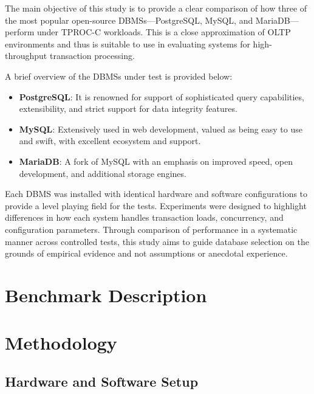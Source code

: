 The main objective of this study is to provide a clear comparison of how three of the most popular open-source DBMSs—PostgreSQL, MySQL, and MariaDB—perform under TPROC-C workloads. This is a close approximation of OLTP environments and thus is suitable to use in evaluating systems for high-throughput transaction processing.

A brief overview of the DBMSs under test is provided below:

\begin{itemize}
    \item \textbf{PostgreSQL}: It is renowned for support of sophisticated query capabilities, extensibility, and strict support for data integrity features.
    \item \textbf{MySQL}: Extensively used in web development, valued as being easy to use and swift, with excellent ecosystem and support.
    \item \textbf{MariaDB}: A fork of MySQL with an emphasis on improved speed, open development, and additional storage engines.
\end{itemize}

Each DBMS was installed with identical hardware and software configurations to provide a level playing field for the tests. Experiments were designed to highlight differences in how each system handles transaction loads, concurrency, and configuration parameters. Through comparison of performance in a systematic manner across controlled tests, this study aims to guide database selection on the grounds of empirical evidence and not assumptions or anecdotal experience.


\section{Benchmark Description}
\label{sec:benchmark}

\section{Methodology}
\label{sec:methodology}

\pagebreak

\subsection{Hardware and Software Setup}
\label{sec:hardware-software-setup}

